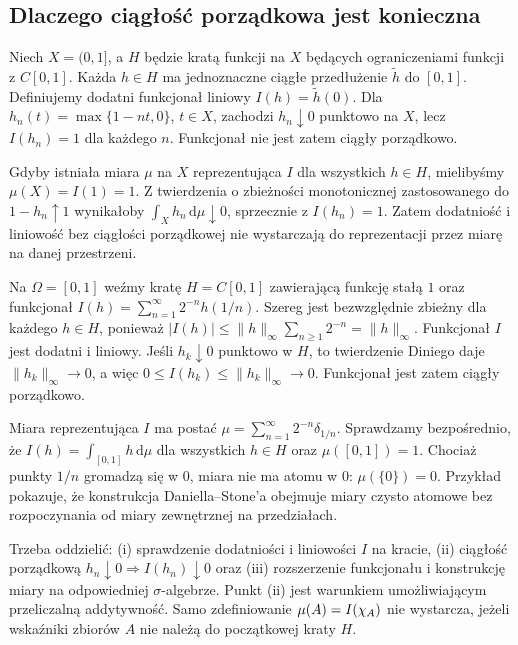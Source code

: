 \subsection*{Dlaczego ciągłość porządkowa jest konieczna}
\begin{przyklad}\label{prz:daniel-koniecznosc}
Niech $X=(0,1]$, a $H$ będzie kratą funkcji na $X$ będących ograniczeniami funkcji z $C[0,1]$. Każda $h\in H$ ma jednoznaczne ciągłe przedłużenie $\widetilde h$ do $[0,1]$. Definiujemy dodatni funkcjonał liniowy $I(h)=\widetilde h(0)$. Dla $h_n(t)=\max\{1-nt,0\}$, $t\in X$, zachodzi $h_n\downarrow0$ punktowo na $X$, lecz $I(h_n)=1$ dla każdego $n$. Funkcjonał nie jest zatem ciągły porządkowo.

Gdyby istniała miara $\mu$ na $X$ reprezentująca $I$ dla wszystkich $h\in H$, mielibyśmy $\mu(X)=I(1)=1$. Z twierdzenia o zbieżności monotonicznej zastosowanego do $1-h_n\uparrow1$ wynikałoby $\int_Xh_n\,\mathrm d\mu\downarrow0$, sprzecznie z $I(h_n)=1$. Zatem dodatniość i liniowość bez ciągłości porządkowej nie wystarczają do reprezentacji przez miarę na danej przestrzeni.
\end{przyklad}
\begin{przyklad}\label{prz:daniell-atoms}
Na $\Omega=[0,1]$ weźmy kratę $H=C[0,1]$ zawierającą funkcję stałą $1$ oraz funkcjonał
$I(h)=\sum_{n=1}^\infty 2^{-n}h(1/n)$. Szereg jest bezwzględnie zbieżny dla każdego $h\in H$, ponieważ $|I(h)|\le\|h\|_\infty\sum_{n\ge1}2^{-n}=\|h\|_\infty$. Funkcjonał $I$ jest dodatni i liniowy. Jeśli $h_k\downarrow0$ punktowo w $H$, to twierdzenie Diniego daje $\|h_k\|_\infty\to0$, a więc $0\le I(h_k)\le\|h_k\|_\infty\to0$. Funkcjonał jest zatem ciągły porządkowo.

Miara reprezentująca $I$ ma postać $\mu=\sum_{n=1}^\infty 2^{-n}\delta_{1/n}$. Sprawdzamy bezpośrednio, że $I(h)=\int_{[0,1]}h\,\mathrm d\mu$ dla wszystkich $h\in H$ oraz $\mu([0,1])=1$. Chociaż punkty $1/n$ gromadzą się w $0$, miara nie ma atomu w $0$: $\mu(\{0\})=0$. Przykład pokazuje, że konstrukcja Daniella--Stone'a obejmuje miary czysto atomowe bez rozpoczynania od miary zewnętrznej na przedziałach.
\end{przyklad}
\begin{uwaga}
Trzeba oddzielić: (i) sprawdzenie dodatniości i liniowości $I$ na kracie, (ii) ciągłość porządkową $h_n\downarrow0\Rightarrow I(h_n)\downarrow0$ oraz (iii) rozszerzenie funkcjonału i konstrukcję miary na odpowiedniej $\sigma$-algebrze. Punkt (ii) jest warunkiem umożliwiającym przeliczalną addytywność. Samo zdefiniowanie $\mu(A)=I(\chi_{A})$ nie wystarcza, jeżeli wskaźniki zbiorów $A$ nie należą do początkowej kraty $H$.
\end{uwaga}

